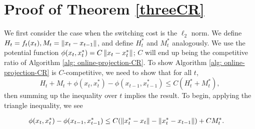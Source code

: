 \section{Proof of Theorem \ref{threeCR}}
We first consider the case when the switching cost is the $\ell_2$ norm. We define $H_t = f_t(x_t), M_t =\left\lVert x_t - x_{t-1} \right\rVert$, and define $H_t^*$ and $M_t^*$ analogously. We use the potential function $\phi(x_t, x_t^*) = C \left\lVert x_t - x_t^* \right\rVert$; $C$ will end up being the competitive ratio of Algorithm \ref{alg: online-projection-CR}. To show Algorithm \ref{alg: online-projection-CR} is $C$-competitive, we need to show that for all $t$, 
\begin{equation}
 	H_t + M_t + \phi(x_t, x_t^*) - \phi(x_{t-1}, x_{t-1}^*) \le C(H_t^* + M_t^*),
    \label{eqn: potential-ineq}
\end{equation}
then summing up the inequality over $t$ implies the result. 
To begin, applying the triangle inequality, we see  

\begin{align}
	\phi(x_t, x_t^*) - \phi(x_{t-1}, x_{t-1}^*) &\le C  (\left\lVert x_t^* - x_t \right\rVert - \left\lVert x_t^* - x_{t-1} \right\rVert) + C M_t^*.
    \label{eqn: potential-change}
\end{align}


